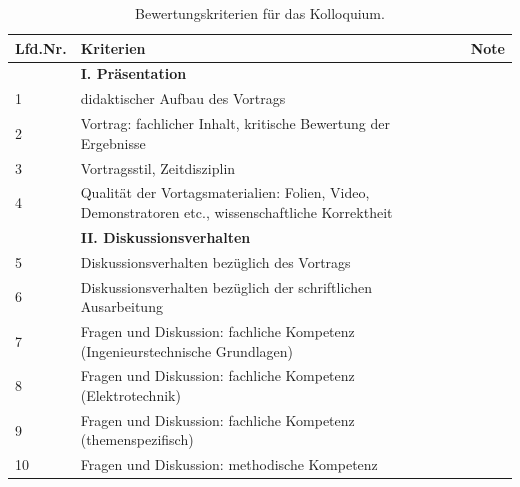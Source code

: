 \begin{table}[!ph]
\centering
\begin{tabular}{ |p{1cm}|p{10cm}|p{0.7cm}|  }
 \hline
 Lfd.Nr. & Kriterien & Note \\  
\hline\hline
& \textbf{I. Präsentation}&\\
\hline
1   &didaktischer Aufbau des Vortrags&\\
\hline
2   &Vortrag: fachlicher Inhalt, kritische Bewertung der Ergebnisse&\\
\hline
3   &Vortragsstil, Zeitdisziplin&\\
\hline
4   &Qualität der Vortagsmaterialien: Folien, Video, Demonstratoren etc., wissenschaftliche Korrektheit&\\
\hline
& \textbf{II. Diskussionsverhalten}&\\
\hline
5   &Diskussionsverhalten bezüglich des Vortrags&\\
\hline
6   &Diskussionsverhalten bezüglich der schriftlichen Ausarbeitung&\\
\hline
7   &Fragen und Diskussion: fachliche Kompetenz (Ingenieurstechnische Grundlagen)&\\
\hline
8   &Fragen und Diskussion: fachliche Kompetenz (Elektrotechnik)&\\
\hline
9   &Fragen und Diskussion: fachliche Kompetenz (themenspezifisch)&\\
\hline 
10  &Fragen und Diskussion: methodische Kompetenz&\\
\hline
\end{tabular}
\caption{Bewertungskriterien für das Kolloquium.}
\label{tab:kolloquium}
\end{table}


